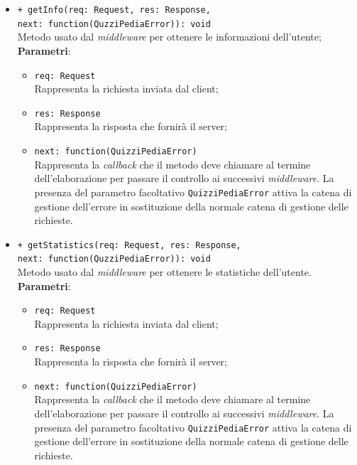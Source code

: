 \begin{itemize}
\begin{itemize}
\begin{itemize}
		 \end{itemize}
		  \item
		 \texttt{+ getInfo(req: Request, res: Response, \\next: function(QuzziPediaError)): void} \\
		Metodo usato dal \textit{middleware} per ottenere le informazioni dell'utente; \\
		\textbf{Parametri}:
		 \begin{itemize}
		  \item
			\texttt{req: Request} \\
			Rappresenta la richiesta inviata dal client;
		  \item
			\texttt{res: Response} \\
			Rappresenta la risposta che fornirà il server;
		  \item
		    \texttt{next: function(QuizziPediaError)} \\
			Rappresenta la \textit{callback} che il metodo deve chiamare al termine dell'elaborazione per passare il controllo ai successivi \textit{middleware}. La presenza del parametro facoltativo \texttt{QuizziPediaError} attiva la catena di gestione dell'errore in sostituzione della normale catena di gestione delle richieste.
		 \end{itemize}
		  \item
		 \texttt{+ getStatistics(req: Request, res: Response, \\next: function(QuzziPediaError)): void} \\
		Metodo usato dal \textit{middleware} per ottenere le statistiche dell'utente. \\
		\textbf{Parametri}:
		 \begin{itemize}
		  \item
			\texttt{req: Request} \\
			Rappresenta la richiesta inviata dal client;
		  \item
			\texttt{res: Response} \\
			Rappresenta la risposta che fornirà il server;
		  \item
		    \texttt{next: function(QuizziPediaError)} \\
			Rappresenta la \textit{callback} che il metodo deve chiamare al termine dell'elaborazione per passare il controllo ai successivi \textit{middleware}. La presenza del parametro facoltativo \texttt{QuizziPediaError} attiva la catena di gestione dell'errore in sostituzione della normale catena di gestione delle richieste.

\end{itemize}
\end{itemize}
\end{itemize}

